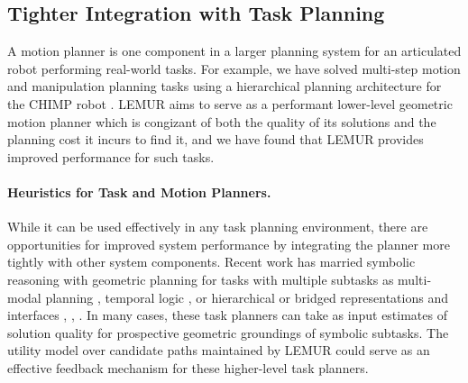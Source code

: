 %
%
%
%

\subsection{Tighter Integration with Task Planning}

A motion planner is one component in a larger planning system for
an articulated robot performing real-world tasks.
For example,
we have solved multi-step motion and manipulation planning tasks
using a hierarchical planning architecture for the CHIMP robot
\citep{dellin2014drc}.
LEMUR aims to serve as a performant lower-level geometric motion
planner which is congizant of both the quality of its solutions
and the planning cost it incurs to find it,
and we have found that LEMUR provides improved performance for
such tasks.

\paragraph{Heuristics for Task and Motion Planners.}
While it can be used effectively in any task planning environment,
there are  opportunities for improved system performance by
integrating the planner more tightly with other system components.
Recent work has married symbolic reasoning with geometric planning
for tasks with multiple subtasks
as multi-modal planning \citep{hauser2010multi},
temporal logic \citep{bhatia2010temporalgoals},
or hierarchical or bridged representations and interfaces
\citep{cambon2009hybrid}, \citep{gravot2005asymov},
\citep{srivastava2014taskmotion}.
In many cases, these task planners can take as input estimates
of solution quality
for prospective geometric groundings of symbolic subtasks.
The utility model over candidate paths maintained by LEMUR could
serve as an effective feedback mechanism for these higher-level
task planners.

